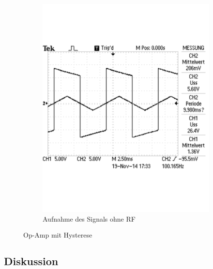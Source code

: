 \documentclass[12pt,a4paper]{article}
\begin{document}
\begin{figure}[H]
\begin{subfigure}[b]{0.48\textwidth}
                \includegraphics[width=\textwidth , scale = 0.4]{2_7_ohne_rf.pdf}
                \caption[Aufnahme des Signals ohne RF]{Aufnahme des Signals ohne RF}
  				\label{fig:2_7_ohne_rf}
        \end{subfigure}
        \caption{Op-Amp mit Hysterese}
        \label{fig:2_7}
\end{figure}

\subsection{Diskussion}
\end{document}

